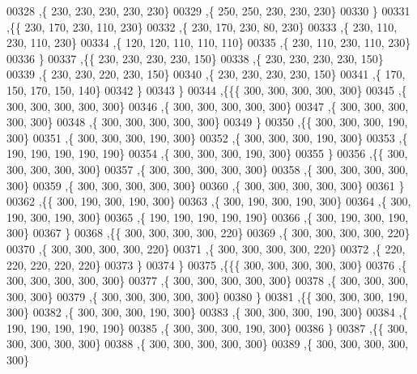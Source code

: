 \begin{DoxyCode}
00328    ,\{   230,   230,   230,   230,   230\}
00329    ,\{   250,   250,   230,   230,   230\}
00330    \}
00331   ,\{\{   230,   170,   230,   110,   230\}
00332    ,\{   230,   170,   230,    80,   230\}
00333    ,\{   230,   110,   230,   110,   230\}
00334    ,\{   120,   120,   110,   110,   110\}
00335    ,\{   230,   110,   230,   110,   230\}
00336    \}
00337   ,\{\{   230,   230,   230,   230,   150\}
00338    ,\{   230,   230,   230,   230,   150\}
00339    ,\{   230,   230,   220,   230,   150\}
00340    ,\{   230,   230,   230,   230,   150\}
00341    ,\{   170,   150,   170,   150,   140\}
00342    \}
00343   \}
00344  ,\{\{\{   300,   300,   300,   300,   300\}
00345    ,\{   300,   300,   300,   300,   300\}
00346    ,\{   300,   300,   300,   300,   300\}
00347    ,\{   300,   300,   300,   300,   300\}
00348    ,\{   300,   300,   300,   300,   300\}
00349    \}
00350   ,\{\{   300,   300,   300,   190,   300\}
00351    ,\{   300,   300,   300,   190,   300\}
00352    ,\{   300,   300,   300,   190,   300\}
00353    ,\{   190,   190,   190,   190,   190\}
00354    ,\{   300,   300,   300,   190,   300\}
00355    \}
00356   ,\{\{   300,   300,   300,   300,   300\}
00357    ,\{   300,   300,   300,   300,   300\}
00358    ,\{   300,   300,   300,   300,   300\}
00359    ,\{   300,   300,   300,   300,   300\}
00360    ,\{   300,   300,   300,   300,   300\}
00361    \}
00362   ,\{\{   300,   190,   300,   190,   300\}
00363    ,\{   300,   190,   300,   190,   300\}
00364    ,\{   300,   190,   300,   190,   300\}
00365    ,\{   190,   190,   190,   190,   190\}
00366    ,\{   300,   190,   300,   190,   300\}
00367    \}
00368   ,\{\{   300,   300,   300,   300,   220\}
00369    ,\{   300,   300,   300,   300,   220\}
00370    ,\{   300,   300,   300,   300,   220\}
00371    ,\{   300,   300,   300,   300,   220\}
00372    ,\{   220,   220,   220,   220,   220\}
00373    \}
00374   \}
00375  ,\{\{\{   300,   300,   300,   300,   300\}
00376    ,\{   300,   300,   300,   300,   300\}
00377    ,\{   300,   300,   300,   300,   300\}
00378    ,\{   300,   300,   300,   300,   300\}
00379    ,\{   300,   300,   300,   300,   300\}
00380    \}
00381   ,\{\{   300,   300,   300,   190,   300\}
00382    ,\{   300,   300,   300,   190,   300\}
00383    ,\{   300,   300,   300,   190,   300\}
00384    ,\{   190,   190,   190,   190,   190\}
00385    ,\{   300,   300,   300,   190,   300\}
00386    \}
00387   ,\{\{   300,   300,   300,   300,   300\}
00388    ,\{   300,   300,   300,   300,   300\}
00389    ,\{   300,   300,   300,   300,   300\}

\end{DoxyCode}
